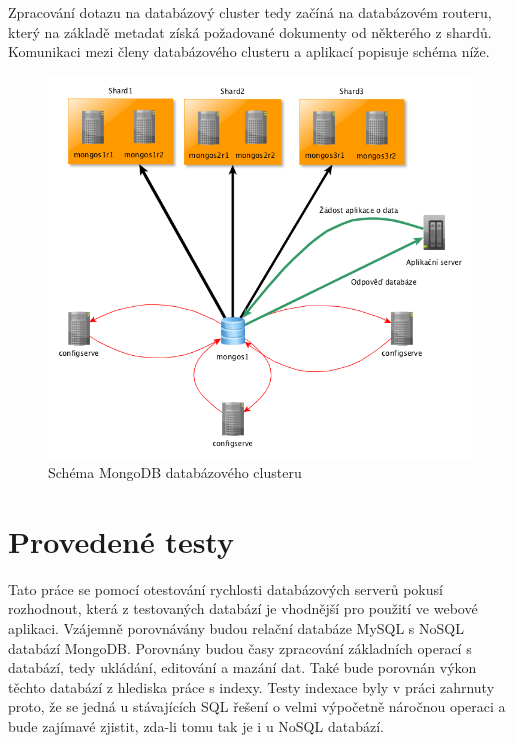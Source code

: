 \pagebreak
Zpracování dotazu na databázový cluster tedy začíná na databázovém routeru, který na základě metadat získá požadované dokumenty od některého z shardů. Komunikaci mezi členy databázového clusteru a aplikací popisuje schéma níže.
\begin{figure}[h]
\begin{centering}
\includegraphics[scale=0.5]{obrazky/cluster-diagram}
\par\end{centering}
\caption{Schéma MongoDB databázového clusteru \label{fig:cluster-diagram}}
\end{figure}

\pagebreak
\section{Provedené testy}
Tato práce se pomocí otestování rychlosti databázových serverů pokusí rozhodnout, která z testovaných databází je vhodnější pro použití ve webové aplikaci. Vzájemně porovnávány budou relační databáze MySQL s NoSQL databází MongoDB. Porovnány budou časy zpracování základních operací s databází, tedy ukládání, editování a mazání dat. Také bude porovnán výkon těchto databází z hlediska práce s indexy. Testy indexace byly v práci zahrnuty proto, že se jedná u stávajících SQL řešení o velmi výpočetně náročnou operaci a bude zajímavé zjistit, zda-li tomu tak je i u NoSQL databází. 

